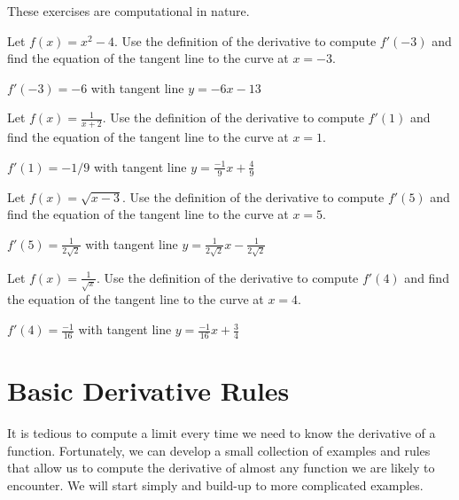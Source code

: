 \begin{exercises}
\break
\noindent These exercises are computational in nature.

\begin{exercise}
Let $f(x) = x^2 -4$. Use the definition of the derivative to compute
$f'(-3)$ and find the equation of the tangent line to the curve at
$x=-3$.
\begin{answer}
$f'(-3) = -6$ with tangent line $y = -6x -13$
\end{answer}
\end{exercise}

\begin{exercise}
Let $f(x) = \frac{1}{x+2}$. Use the definition of the derivative to compute
$f'(1)$ and find the equation of the tangent line to the curve at
$x=1$.
\begin{answer}
$f'(1) = -1/9$ with tangent line $y = \frac{-1}{9}x + \frac{4}{9}$
\end{answer}
\end{exercise}

\begin{exercise}
Let $f(x) = \sqrt{x-3}$. Use the definition of the derivative to compute
$f'(5)$ and find the equation of the tangent line to the curve at
$x=5$.
\begin{answer}
$f'(5) = \frac{1}{2\sqrt{2}}$ with tangent line $y = \frac{1}{2\sqrt{2}}x -\frac{1}{2\sqrt{2}}$
\end{answer}
\end{exercise}

\begin{exercise}
Let $f(x) = \frac{1}{\sqrt{x}}$. Use the definition of the derivative
to compute $f'(4)$ and find the equation of the tangent line to the
curve at $x=4$.
\begin{answer}
$f'(4) = \frac{-1}{16}$ with tangent line $y = \frac{-1}{16}x +\frac{3}{4}$
\end{answer}
\end{exercise}

\end{exercises}




\section{Basic Derivative Rules}


It is tedious to compute a limit every time we need to know the
derivative of a function.  Fortunately, we can develop a small
collection of examples and rules that allow us to compute the
derivative of almost any function we are likely to encounter.  We will
start simply and build-up to more complicated examples.


